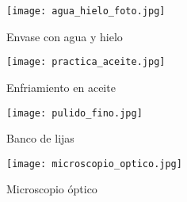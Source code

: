 \documentclass[a4paper, 9pt]{article}
\begin{document}
\begin{figure}[h!] %

\hfill
\begin{minipage}[c]{.45\textwidth}
\begin{center}
\texttt{[image: agua\_hielo\_foto.jpg]}
\caption{Envase con agua y hielo}
\label{agua_hielo_foto}
\end{center}
\end{minipage}
\hfill
\begin{minipage}[c]{.45\textwidth}
\begin{center}
\texttt{[image: practica\_aceite.jpg]}
\caption{Enfriamiento en aceite}
\label{practica_aceite}
\end{center}
\end{minipage}
\hfill
\end{figure}
\newpage
\begin{figure}[h] %

\hfill
\begin{minipage}[t]{.45\textwidth}
\begin{center}
\texttt{[image: pulido\_fino.jpg]}
\caption{Banco de lijas}
\label{pulido_fino}
\end{center}
\end{minipage}
\hfill
\begin{minipage}[t]{.45\textwidth}
\begin{center}
\texttt{[image: microscopio\_optico.jpg]}
\caption{Microscopio óptico}
\label{microscopio_optico}
\end{center}
\end{minipage}
\hfill
\end{figure}
\end{document}
